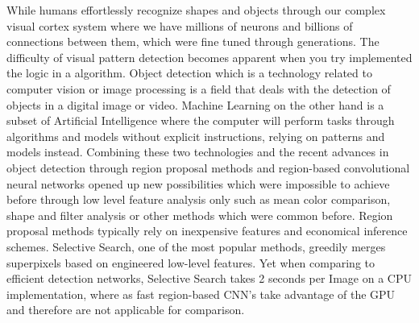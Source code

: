 
While humans effortlessly recognize shapes and objects through our complex visual cortex system where we have millions of neurons and billions of connections between them, which were fine tuned through generations. The difficulty of visual pattern detection becomes apparent when you try implemented the logic in a algorithm.\cite{neuralnetworksanddeeplearning} 
\newline
\newline
Object detection which is a technology related to computer vision or image processing is a field that deals with the detection of objects in a digital image or video.
\newline
Machine Learning on the other hand is a subset of Artificial Intelligence where the computer will perform tasks through algorithms and models without explicit instructions, relying on patterns  and models instead.
\newline
\newline
Combining these two technologies and the recent advances in object detection through region proposal methods and region-based convolutional
neural networks opened up new possibilities which were impossible to achieve before through low level feature analysis only such as mean color comparison, shape and filter analysis or other methods which were common before.
\newline
\newline
Region proposal methods typically rely on inexpensive features and economical inference schemes. Selective Search, one of the most popular
methods, greedily merges superpixels based on engineered low-level features. Yet when comparing to efficient detection networks, Selective
Search takes 2 seconds per Image on a CPU implementation, where as fast region-based CNN's take advantage of the GPU and therefore are not applicable for comparison.\cite{faster-rcnn}
\newline

